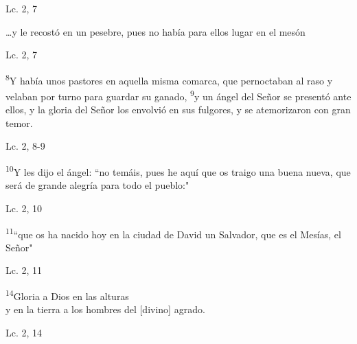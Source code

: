 \documentclass[a4paper,11pt,sans]{article}
\begin{document}
      \begin{center}
        Lc. 2, 7          
      \end{center}
      
      \begin{center}
        \ldots y le recostó en un pesebre, pues no había para ellos lugar en el mesón
      \end{center}
      
      \begin{center}
        Lc. 2, 7         
      \end{center}
      
      \begin{center}
        \textsuperscript{8}Y había unos pastores en aquella misma comarca, que pernoctaban al raso y velaban por turno para guardar su ganado, \textsuperscript{9}y un ángel
        del Señor se presentó ante ellos, y la gloria del Señor los envolvió en sus fulgores, y se atemorizaron con gran temor.
      \end{center}
      \begin{center}
        Lc. 2, 8-9         
      \end{center}
      
      \begin{center}
        \textsuperscript{10}Y les dijo el ángel: ``no temáis, pues he aquí que os traigo una buena nueva, que será de grande alegría para todo el pueblo:"
      \end{center}
      \begin{center}
        Lc. 2, 10         
      \end{center}

      \begin{center}
        \textsuperscript{11}``que os ha nacido hoy en la ciudad de David un Salvador, que es el Mesías, el Señor"
      \end{center}
      \begin{center}
        Lc. 2, 11       
      \end{center}
      
      \begin{center}
        \textsuperscript{14}Gloria a Dios en las alturas \\
        y en la tierra a los hombres del [divino] agrado.
      \end{center}

      \begin{center}
        Lc. 2, 14        
      \end{center}
      
\end{document}
